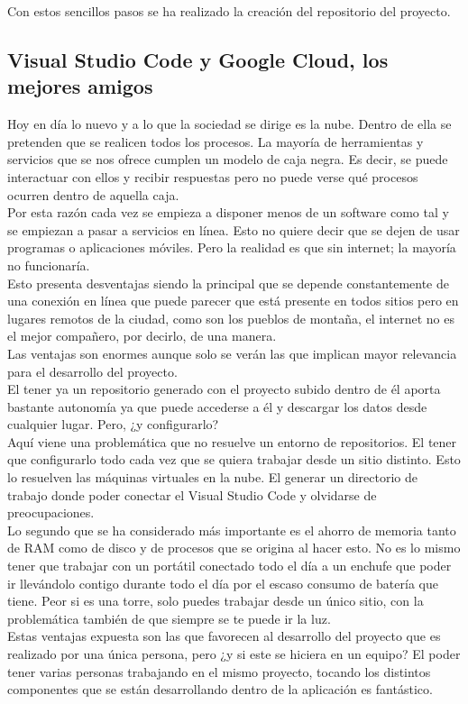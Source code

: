 Con estos sencillos pasos se ha realizado la creación del repositorio del proyecto.

\subsection{Visual Studio Code y Google Cloud, los mejores amigos}
Hoy en día lo nuevo y a lo que la sociedad se dirige es la nube. Dentro de ella se pretenden que se realicen todos los procesos. La mayoría de herramientas y servicios que se nos ofrece cumplen un modelo de caja negra. Es decir, se puede interactuar con ellos y recibir respuestas pero no puede verse qué procesos ocurren dentro de aquella caja.
\\Por esta razón cada vez se empieza a disponer menos de un software como tal y se empiezan a pasar a servicios en línea. Esto no quiere decir que se dejen de usar programas o aplicaciones móviles. Pero la realidad es que sin internet; la mayoría no funcionaría.
\\Esto presenta desventajas siendo la principal que se depende constantemente de una conexión en línea que puede parecer que está presente en todos sitios pero en lugares remotos de la ciudad, como son los pueblos de montaña, el internet no es el mejor compañero, por decirlo, de una manera.
\\Las ventajas son enormes aunque solo se verán las que implican mayor relevancia para el desarrollo del proyecto.
\\El tener ya un repositorio generado con el proyecto subido dentro de él aporta bastante autonomía ya que puede accederse a él y descargar los datos desde cualquier lugar. Pero, ¿y configurarlo?
\\Aquí viene una problemática que no resuelve un entorno de repositorios. El tener que configurarlo todo cada vez que se quiera trabajar desde un sitio distinto. Esto lo resuelven las máquinas virtuales en la nube. El generar un directorio de trabajo donde poder conectar el Visual Studio Code y olvidarse de preocupaciones.
\\Lo segundo que se ha considerado más importante es el ahorro de memoria tanto de RAM como de disco y de procesos que se origina al hacer esto. No es lo mismo tener que trabajar con un portátil conectado todo el día a un enchufe que poder ir llevándolo contigo durante todo el día por el escaso consumo de batería que tiene. Peor si es una torre, solo puedes trabajar desde un único sitio, con la problemática también de que siempre se te puede ir la luz.
\\Estas ventajas expuesta son las que favorecen al desarrollo del proyecto que es realizado por una única persona, pero ¿y si este se hiciera en un equipo? El poder tener varias personas trabajando en el mismo proyecto, tocando los distintos componentes que se están desarrollando dentro de la aplicación es fantástico.

